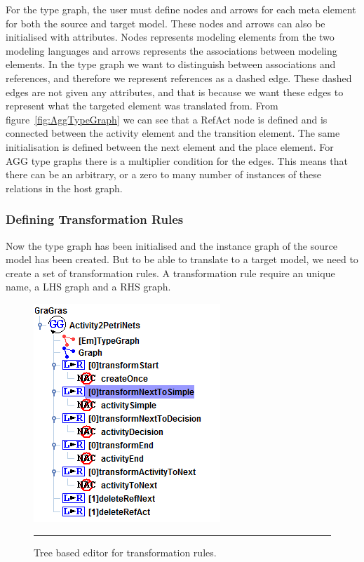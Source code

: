 For the type graph, the user must define nodes and arrows for each meta
element for both the source and target model. These nodes and arrows can also
be initialised with attributes. Nodes represents modeling elements from the two
modeling languages and arrows represents the associations between modeling
elements. In the type graph we want to distinguish between associations and
references, and therefore we represent references as a dashed edge. These
dashed edges are not given any attributes, and that is because we want these
edges to represent what the targeted element was translated from. From
figure~\ref{fig:AggTypeGraph} we can see that a RefAct node is defined and is
connected between the activity element and the transition element. The same
initialisation is defined between the next element and the place element. For
AGG type graphs there is a multiplier condition for the edges. This means that
there can be an arbitrary, or a zero to many number of instances of these
relations in the host graph.

\subsubsection*{Defining Transformation Rules}
Now the type graph has been initialised and the instance graph of the
source model has been created. But to be able to translate to a target model,
we need to create a set of transformation rules. A transformation rule
require an unique name, a LHS graph and a RHS graph. 

\begin{figure}[H]
	\centering
	\includegraphics[scale=0.7]{figures/AGGTreeBasedEditor.png}
	\rule{35em}{0.5pt}
	\caption[Tree based editor in AGG]
	{Tree based editor for transformation rules.}
	\label{fig:AGGTreeBasedEditor}
\end{figure}

